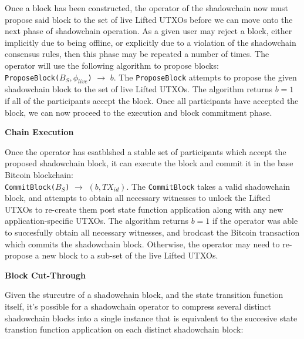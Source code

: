\documentclass[10pt,a4paper]{article}
\theoremstyle{definition}
\begin{document}
Once a block has been constructed, the operator of the shadowchain now must
propose said block to the set of live Lifted UTXOs before we can move onto the
next phase of shadowchain operation. As a given user may reject a block, either
implicitly due to being offline, or explicitly due to a violation of the
shadowchain consensus rules, then this phase may be repeated a number of times.
The operator will use the following algorithm to propose blocks: \\

\texttt{ProposeBlock($B_S, \phi_{live}$)} $\rightarrow$ $b$. The
\texttt{ProposeBlock} attempts to propose the given shadowchain block to the
set of live Lifted UTXOs. The algorithm returns $b=1$ if all of the
participants accept the block. Once all participants have accepted the block,
we can now proceed to the execution and block commitment phase.


\begin{center}
    \textbf{Chain Execution}
\end{center}

Once the operator has esatblshed a stable set of participants which accept the
proposed shadowchain block, it can execute the block and commit it in the base Bitcoin blockchain: \\

\texttt{CommitBlock($B_S$)} $\rightarrow$ $(b, TX_{id})$. The
\texttt{CommitBlock} takes a valid shadowchain block, and attempts to obtain
all necessary witnesses to unlock the Lifted UTXOs to re-create them post state
function application along with any new application-specific UTXOs. The
algorithm returns $b=1$ if the operator was able to succesfully obtain all
necessary witnesses, and brodcast the Bitcoin transaction which commits the
shadowchain block. Otherwise, the operator may need to re-propose a new block
to a sub-set of the live Lifted UTXOs.

\begin{center}
    \textbf{Block Cut-Through}
\end{center}

Given the sturcutre of a shadowchain block, and the state transition function
itself, it's possible for a shadowchain operator to compress several distinct
shadowchain blocks into a single instance that is equivalent to the succesive
state transtion function application on each distinct shadowchain block: \\
\end{document}
